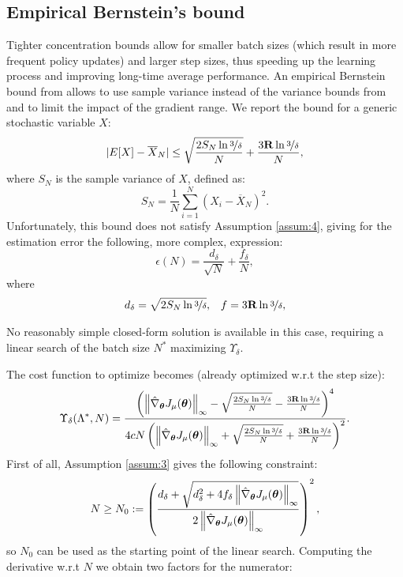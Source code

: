 \subsection{Empirical Bernstein's bound}
Tighter concentration bounds allow for smaller batch sizes (which result in more frequent policy updates) and larger step sizes, thus speeding up the learning process and improving long-time average performance. An empirical Bernstein bound from \cite{Mnih:2008:EBS:1390156.1390241} allows to use sample variance instead of the variance bounds from \cite{DBLP:journals/nn/ZhaoHNS12} and to limit the impact of the gradient range. We report the bound for a generic stochastic variable $X$:
\[
	|E[X] - \overline{X}_N| \leq  \sqrt{\frac{2S_N\ln{\nicefrac{3}{\delta}}}{N}}
		+ \frac{3\mathbf{R}\ln{\nicefrac{3}{\delta}}}{N},
\]
where $S_N$ is the sample variance of $X$, defined as:
\[
	S_N = \frac{1}{N}\sum\limits_{i=1}^N(X_i - \overline{X}_N)^2.
\]
Unfortunately, this bound does not satisfy Assumption \ref{assum:4}, giving for the estimation error the following, more complex, expression:
 \[
 \epsilon(N) = \frac{d_\delta}{\sqrt{N}} + \frac{f_\delta}{N},
\]
where
\begin{align*}
d_\delta= \sqrt{2S_N\ln{\nicefrac{3}{\delta}}}, && f=3\mathbf{R}\ln{\nicefrac{3}{\delta}},
\end{align*}

No reasonably simple closed-form solution is available in this case, requiring a linear search of the batch size $N^*$ maximizing $\Upsilon_\delta$. 

The cost function to optimize becomes (already optimized w.r.t the step size):
\[
\Upsilon_{\delta}(\Lambda^*,N) = \frac{\left(\norm[\infty]{\gradApp{\vtheta}} - 
		\sqrt{\frac{2S_N\ln{\nicefrac{3}{\delta}}}{N}} - \frac{3\mathbf{R}\ln{\nicefrac{3}{\delta}}}{N}\right)^4}
		{4cN
		\left(\norm[\infty]{\gradApp{\vtheta}} + 
				\sqrt{\frac{2S_N\ln{\nicefrac{3}{\delta}}}{N}} + \frac{3\mathbf{R}\ln{\nicefrac{3}{\delta}}}{N}\right)^2}.
\]
First of all, Assumption \ref{assum:3} gives the following constraint:
\[
N \geq N_0 := \left(\frac{d_{\delta} + \sqrt{d_{\delta}^2 + 4f_{\delta}\norm[\infty]{\gradApp{\vtheta}}}}
{2\norm[\infty]{\gradApp{\vtheta}}}
\right)^2,
\]
so $N_0$ can be used as the starting point of the linear search.
Computing the derivative w.r.t $N$ we obtain two factors for the numerator:

